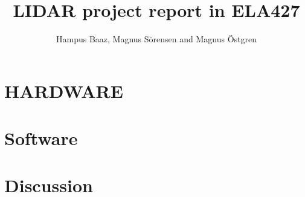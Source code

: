

\title{\LARGE \bf
LIDAR project report in ELA427}
\author{Hampus Baaz, Magnus Sörensen and Magnus Östgren}


\maketitle
\thispagestyle{empty}
\pagestyle{empty}

\begin{abstract}

\end{abstract}







\section{HARDWARE}\label{section:hardware}


\section{Software}\label{section:software}



\section{Discussion}\label{section:discussion}


\printbibliography
